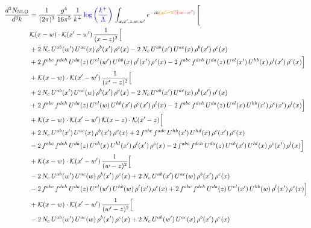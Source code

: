 \documentclass[9pt]{article}
\numberwithin{equation}{section}
\begin{document}
\begin{align}
\frac{d^{3}N_{\mathrm{NLO}}}{d^{3}k} & = \frac{1}{(2\pi)^{3}}\,\frac{g^{4}}{16\pi^{5}}\,\frac{1}{k^{+}}\,{\color{blue}\log{\left(\frac{k^{+}}{\Lambda}\right)}}\,\int_{x,x',z,w,w'}e^{-ik{\color{orange}\cancel{(w'-w)}}{\color{red}(w-w')}}\,\Bigg[
\notag \\ & \mathcal{K}(x-w)\cdot\mathcal{K}(x'-w')\,\frac{1}{(x-z)^{2}}\Big[\notag\\
&+2\,N_{c}\,U^{ab}(w')\,U^{ac}(x)\,\rho^{b}(x')\,\rho^{c}(x) -2\,N_{c}\,U^{ab}(x')\,U^{ac}(x)\,\rho^{b}(x')\,\rho^{c}(x)\notag\\
& +2\,f^{abc}\,f^{deh}\,U^{da}(z)\,U^{el}(w')\,U^{hb}(x)\,\rho^{l}(x')\,\rho^{c}(x) -2\,f^{abc}\,f^{deh}\,U^{da}(z)\,U^{el}(x')\,U^{hb}(x)\,\rho^{l}(x')\,\rho^{c}(x)\Big]\notag\\
& +\mathcal{K}(x-w)\cdot\mathcal{K}(x'-w')\,\frac{1}{(x'-z)^{2}}\Big[\notag\\
& +2\,N_{c}\,U^{ab}(x')\,U^{ac}(w)\,\rho^{b}(x')\,\rho^{c}(x) -2\,N_{c}\,U^{ab}(x')\,U^{ac}(x)\,\rho^{b}(x')\,\rho^{c}(x)\notag\\
& +2\,f^{abc}\,f^{deh}\,U^{da}(z)\,U^{el}(w)\,U^{hb}(x')\,\rho^{c}(x')\,\rho^{l}(x) -2\,f^{abc}\,f^{deh}\,U^{da}(z)\,U^{el}(x)\,U^{hb}(x')\,\rho^{c}(x')\,\rho^{l}(x)\Big]\notag\\
& +\mathcal{K}(x-w)\cdot\mathcal{K}(x'-w')\,\mathcal{K}(x-z)\cdot\mathcal{K}(x'-z)\Big[\notag\\
& +2\,N_{c}\,U^{ab}(x')\,U^{ac}(x)\,\rho^{b}(x')\,\rho^{c}(x) +2\,f^{abc}\,f^{ade}\,U^{hb}(x')\,U^{hd}(x)\,\rho^{c}(x')\,\rho^{e}(x)\notag\\
& -2\,f^{abc}\,f^{deh}\,U^{da}(z)\,U^{eb}(x)\,U^{hl}(x')\,\rho^{l}(x')\,\rho^{c}(x) -2\,f^{abc}\,f^{deh}\,U^{da}(z)\,U^{eb}(x')\,U^{hl}(x)\,\rho^{c}(x')\,\rho^{l}(x)\Big]\notag\\
& +\mathcal{K}(x-w)\cdot\mathcal{K}(x'-w')\,\frac{1}{(w-z)^{2}}\Big[\notag\\
& -2\,N_{c}\,U^{ab}(w')\,U^{ac}(w)\,\rho^{b}(x')\,\rho^{c}(x) +2\,N_{c}\,U^{ab}(x')\,U^{ac}(w)\,\rho^{b}(x')\,\rho^{c}(x)\notag\\
& -2\,f^{abc}\,f^{deh}\,U^{da}(z)\,U^{el}(w')\,U^{hb}(w)\,\rho^{l}(x')\,\rho^{c}(x) +2\,f^{abc}\,f^{deh}\,U^{da}(z)\,U^{el}(x')\,U^{hb}(w)\,\rho^{l}(x')\,\rho^{c}(x)\Big]\notag\\
& +\mathcal{K}(x-w)\cdot\mathcal{K}(x'-w')\,\frac{1}{(w'-z)^{2}}\Big[\notag\\
& -2\,N_{c}\,U^{ab}(w')\,U^{ac}(w)\,\rho^{b}(x')\,\rho^{c}(x) +2\,N_{c}\,U^{ab}(w')\,U^{ac}(x)\,\rho^{b}(x')\,\rho^{c}(x)\notag\\

\end{align}
\end{document}
